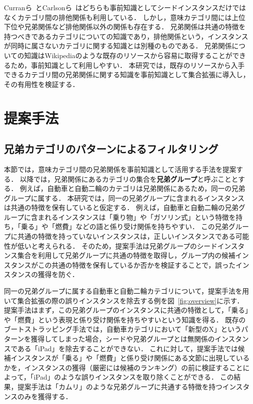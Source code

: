 \documentclass[japanese]{jnlp_1.4}
\begin{document}
Curranら~\cite{Curran_minimisingsemantic}とCarlsonら~\cite{carlson-wsdm}はどちらも事前知識としてシードインスタンスだけではなくカテゴリ間の排他関係も利用している．
しかし，意味カテゴリ間には上位下位や兄弟関係など排他関係以外の関係も存在する．
兄弟関係は共通の特徴を持つべきであるカテゴリについての知識であり，排他関係という，インスタンスが同時に属さないカテゴリに関する知識とは別種のものである．
兄弟関係についての知識はWikipediaのような既存のリソースから容易に取得することができるため，事前知識として利用しやすい．
本研究では，既存のリソースから入手できるカテゴリ間の兄弟関係に関する知識を事前知識として集合拡張に導入し，その有用性を検証する．



\section{提案手法}

\subsection{兄弟カテゴリのパターンによるフィルタリング}

本節では，意味カテゴリ間の兄弟関係を事前知識として活用する手法を提案する．
以降では，兄弟関係にあるカテゴリの集合を\textbf{兄弟グループ}と呼ぶこととする．
例えば，自動車と自動二輪のカテゴリは兄弟関係にあるため，同一の兄弟グループに属する．
本研究では，同一の兄弟グループに含まれるインスタンスは共通の特徴を保有していると仮定する．
例えば，自動車と自動二輪の兄弟グループに含まれるインスタンスは「乗り物」や「ガソリン式」という特徴を持ち，「乗る」や「燃費」などの語と係り受け関係を持ちやすい．
この兄弟グループに共通の特徴を持っていないインスタンスは，正しいインスタンスである可能性が低いと考えられる．
そのため，提案手法は兄弟グループのシードインスタンス集合を利用して兄弟グループに共通の特徴を取得し，グループ内の候補インスタンスがこの共通の特徴を保有しているか否かを検証することで，誤ったインスタンスの獲得を防ぐ．


同一の兄弟グループに属する自動車と自動二輪カテゴリについて，提案手法を用いて集合拡張の際の誤りインスタンスを除去する例を図~\ref{fig:overview}に示す．
提案手法はまず，この兄弟グループのインスタンスに共通の特徴として，「乗る」や「燃費」という表現と係り受け関係を持ちやすいという知識を得る．
既存のブートストラッピング手法では，自動車カテゴリにおいて「新型のX」というパターンを獲得してしまった場合，シードや兄弟グループとは無関係のインスタンスである「iPad」を除去することができない．
これに対して，提案手法では候補インスタンスが「乗る」や「燃費」と係り受け関係にある文節に出現しているかを，インスタンスの獲得（厳密には候補のランキング）の前に検証することによって，「iPad」のような誤りインスタンスを取り除くことができる．
この結果，提案手法は「カムリ」のような兄弟グループに共通する特徴を持つインスタンスのみを獲得する．
\end{document}
